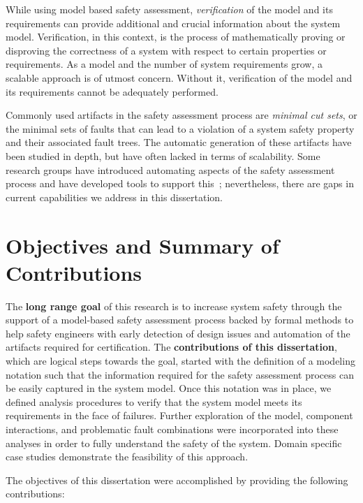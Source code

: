 While using model based safety assessment, \emph{verification} of the model and its requirements can provide additional and crucial information about the system model. Verification, in this context, is the process of mathematically proving or disproving the correctness of a system with respect to certain properties or requirements. As a model and the number of system requirements grow, a scalable approach is of utmost concern. Without it, verification of the model and its requirements cannot be adequately performed. 

Commonly used artifacts in the safety assessment process are \emph{minimal cut sets}, or the minimal sets of faults that can lead to a violation of a system safety property and their associated fault trees. The automatic generation of these artifacts have been studied in depth, but have often lacked in terms of scalability\cite{minato2001zero,vesely1981fault,jung2008fast,matuzas2015dynamic,Bieber04safetyassessment}. Some research groups have introduced automating aspects of the safety assessment process and have developed tools to support this~\cite{Joshi05:SafeComp,CAV2015:BoCiGrMa,contractBasedDesign}; nevertheless, there are gaps in current capabilities we address in this dissertation. 

\section{Objectives and Summary of Contributions}
The \textbf{long range goal} of this research is to increase system safety through the support of a model-based safety assessment process backed by formal methods to help safety engineers with early detection of design issues and automation of the artifacts required for certification. The \textbf{contributions of this dissertation}, which are logical steps towards the goal, started with the definition of a modeling notation such that the information required for the safety assessment process can be easily captured in the system model. Once this notation was in place, we defined analysis procedures to verify that the system model meets its requirements in the face of failures. Further exploration of the model, component interactions, and problematic fault combinations were incorporated into these analyses in order to fully understand the safety of the system. Domain specific case studies demonstrate the feasibility of this approach.

The objectives of this dissertation were accomplished by providing the following contributions: 


